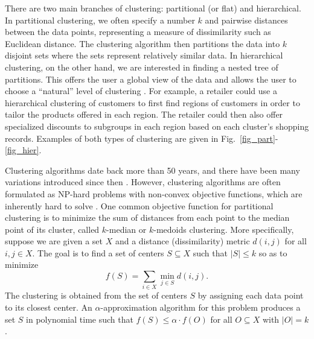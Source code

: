 \documentclass[conference, 10pt, final]{IEEEtran}
\begin{document}
There are two main branches of clustering: partitional (or flat) and hierarchical. In partitional clustering, we often specify a number $k$ and pairwise distances between the data points, representing a measure of dissimilarity such as Euclidean distance. The clustering algorithm then partitions the data into $k$ disjoint sets where the sets represent relatively similar data. In hierarchical clustering, on the other hand, we are interested in finding a nested tree of partitions. This offers the user a global view of the data and allows the user to choose a ``natural'' level of clustering \cite{ESL}. For example, a retailer could use a hierarchical clustering of customers to first find regions of customers in order to tailor the products offered in each region. The retailer could then also offer specialized discounts to subgroups in each region based on each cluster's shopping records. Examples of both types of clustering are given in Fig.~\ref{fig_part}-\ref{fig_hier}.

Clustering algorithms date back more than 50 years, and there have been many variations introduced since then \cite{Jain}. However, clustering algorithms are often formulated as NP-hard problems with non-convex objective functions, which are inherently hard to solve \cite{Jain}.
One common objective function for partitional clustering is to minimize the sum of distances from each point to the median point of its cluster, called $k$-median or $k$-medoids clustering. More specifically, suppose we are given a set $X$ and a distance (dissimilarity) metric $d(i,j)$ for all $i,j \in X$. The goal is to find a set of centers $S \subseteq X$ such that $|S| \leq k$ so as to minimize 
\[ f(S) = \sum_{ i\in X} \min_{j \in S} d(i,j). \]
The clustering is obtained from the set of centers $S$ by assigning each data point to its closest center.  An $\alpha$-approximation algorithm for this problem produces a set $S$ in polynomial time such that $f(S) \leq \alpha \cdot f(O)$ for all $O \subseteq X$ with $|O| = k$. 
\end{document}
